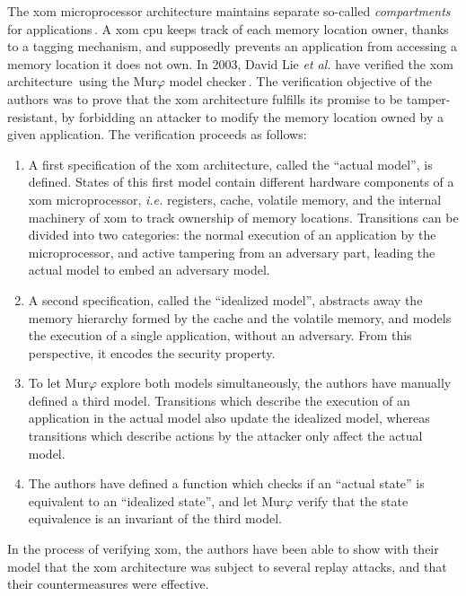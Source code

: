The \ac{xom} microprocessor architecture maintains separate so-called
\emph{compartments} for applications\,\cite{lie2000architectural}.
%
A \ac{xom} \ac{cpu} keeps track of each memory location owner, thanks to a
tagging mechanism, and supposedly prevents an application from accessing a
memory location it does not own.
%
In 2003, David Lie \emph{et al.} have verified the \ac{xom}
architecture\,\cite{lie2003xom} using the Mur$\varphi$ model
checker\,\cite{murphi}.
%
The verification objective of the authors was to prove that the \ac{xom}
architecture fulfills its promise to be tamper-resistant, by forbidding an
attacker to modify the memory location owned by a given application.
%
The verification proceeds as follows:
%
\begin{enumerate}
\item A first specification of the \ac{xom} architecture, called the ``actual
  model'', is defined.
  States of this first model contain different hardware components of a \ac{xom}
  microprocessor, \emph{i.e.} registers, cache, volatile memory, and the
  internal machinery of \ac{xom} to track ownership of memory locations.
  Transitions can be divided into two categories: the normal execution of an
  application by the microprocessor, and active tampering from an adversary
  part, leading the actual model to embed an adversary model.
\item A second specification, called the ``idealized model'', abstracts away the
  memory hierarchy formed by the cache and the volatile memory, and models the
  execution of a single application, without an adversary.
  From this perspective, it encodes the security property.
\item To let Mur\( \varphi \) explore both models simultaneously, the authors
  have manually defined a third model.
  Transitions which describe the execution of an application in the actual model
  also update the idealized model, whereas transitions which describe actions by
  the attacker only affect the actual model.
\item The authors have defined a function which checks if an ``actual state'' is
  equivalent to an ``idealized state'', and let Mur\( \varphi \) verify that the
  state equivalence is an invariant of the third model.
\end{enumerate}
%
In the process of verifying \ac{xom}, the authors have been able to show with
their model that the \ac{xom} architecture was subject to several replay
attacks, and that their countermeasures were effective.

